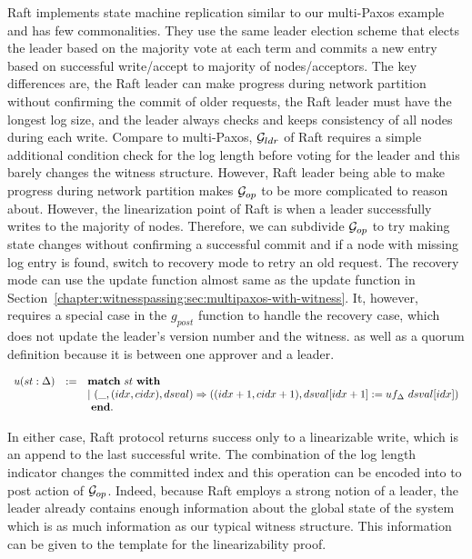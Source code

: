 Raft implements state machine replication similar to our multi-Paxos example and
has few commonalities. They use the same leader election scheme that elects
the leader based on the majority vote at each term and commits a new entry based on
successful write/accept to majority of nodes/acceptors. The key differences are, 
the Raft leader can make progress during network partition without confirming the 
commit of older requests, the Raft leader must have the longest log size, and 
the leader always checks and keeps consistency of all nodes during each write.
Compare to multi-Paxos, $\mathcal{G}_{ldr}$ of Raft requires a simple additional
condition check for the log length before voting for the leader and this barely
changes the witness structure. However, Raft leader being able to make progress
during network partition makes $\mathcal{G}_{op}$ to be more complicated to
reason about. However, the linearization point of Raft is when a leader
successfully writes to the majority of nodes. Therefore, we can subdivide
$\mathcal{G}_{op}$ to try making state changes without confirming a successful
commit and if a node with missing log entry is found, switch to recovery mode
to retry an old request. The recovery mode can use the update function almost same 
as the update function in Section~\ref{chapter:witnesspassing:sec:multipaxos-with-witness}. It, however, 
requires a special case in the $g_{post}$ function to handle the recovery case, 
which does not update the leader's version number and the witness.  
as well as a quorum definition because it is between one approver and a leader.
\begin{center}
$
\begin{array}{lll}
u (st : \dsvalue) &:=&  \mbox{\textbf{match}} \ st \ \mbox{\textbf{with}}\\
&& \vert~(\_, (idx, cidx), dsval) \Rightarrow ((idx + 1, cidx + 1), dsval[idx + 1] := uf_{\dsvalue}\ dsval[idx])\\
&&\ \mbox{\textbf{end}}.\\
\end{array}
$
\end{center}
In either case, Raft protocol returns success only to a
linearizable write, which is an append to the last successful write. The
combination of the log length indicator changes the committed index and this
operation can be encoded into to post action of $\mathcal{G}_{op}$. Indeed,
because Raft employs a strong notion of a leader, the leader already contains
enough information about the global state of the system which is as much
information as our typical witness structure. This information can be given to
the template for the linearizability proof. 


